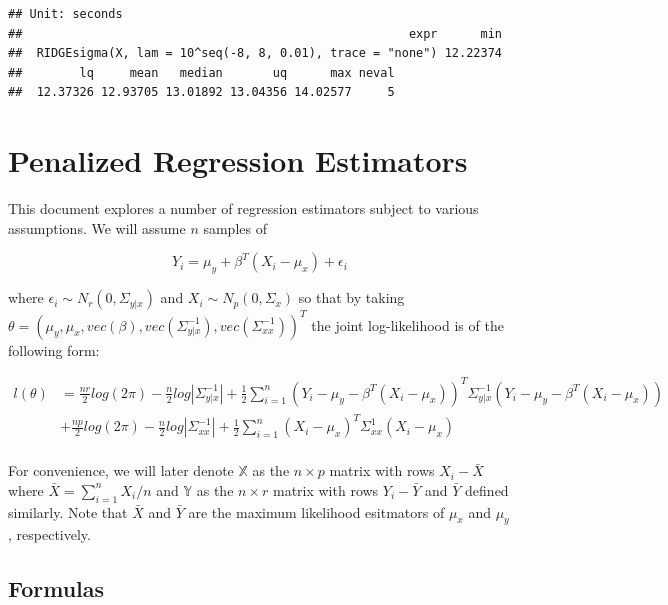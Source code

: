 \documentclass[11pt,]{book}
\theoremstyle{definition}
\theoremstyle{definition}
\theoremstyle{definition}
\theoremstyle{remark}
\begin{document}
\begin{verbatim}
## Unit: seconds
##                                                      expr      min
##  RIDGEsigma(X, lam = 10^seq(-8, 8, 0.01), trace = "none") 12.22374
##        lq     mean   median       uq      max neval
##  12.37326 12.93705 13.01892 13.04356 14.02577     5
\end{verbatim}

\hypertarget{penalized-regression-estimators}{%
\chapter{Penalized Regression
Estimators}\label{penalized-regression-estimators}}

This document explores a number of regression estimators subject to
various assumptions. We will assume \(n\) samples of

\[ Y_{i} = \mu_{y} + \beta^{T}(X_{i} - \mu_{x}) + \epsilon_{i} \]

where \(\epsilon_{i} \sim N_{r}\left(0, \Sigma_{y | x} \right)\) and
\(X_{i} \sim N_{p}\left(0, \Sigma_{x}\right)\) so that by taking
\(\theta = \left( \mu_{y}, \mu_{x}, vec\left( \beta \right), vec\left( \Sigma_{y | x}^{-1} \right), vec\left( \Sigma_{xx}^{-1} \right) \right)^{T}\)
the joint log-likelihood is of the following form:

\begin{align*}
  l(\theta) &= \frac{nr}{2}log(2\pi) - \frac{n}{2}log\left| \Sigma_{y | x}^{-1} \right| + \frac{1}{2}\sum_{i = 1}^{n}\left( Y_{i} - \mu_{y} - \beta^{T}\left( X_{i} - \mu_{x} \right) \right)^{T}\Sigma_{y | x}^{-1}\left( Y_{i} - \mu_{y} - \beta^{T}\left( X_{i} - \mu_{x} \right) \right) \\
  &+ \frac{np}{2}log(2\pi) - \frac{n}{2}log\left| \Sigma_{xx}^{-1} \right| + \frac{1}{2}\sum_{i = 1}^{n}\left( X_{i} - \mu_{x} \right)^{T}\Sigma_{xx}^{1}\left( X_{i} - \mu_{x} \right) \\
\end{align*}

For convenience, we will later denote \(\mathbb{X}\) as the
\(n \times p\) matrix with rows \(X_{i} - \bar{X}\) where
\(\bar{X} = \sum_{i = 1}^{n}X_{i}/n\) and \(\mathbb{Y}\) as the
\(n \times r\) matrix with rows \(Y_{i} - \bar{Y}\) and \(\bar{Y}\)
defined similarly. Note that \(\bar{X}\) and \(\bar{Y}\) are the maximum
likelihood esitmators of \(\mu_{x}\) and \(\mu_{y}\), respectively.

\hypertarget{formulas}{%
\section{Formulas}\label{formulas}}
\end{document}
